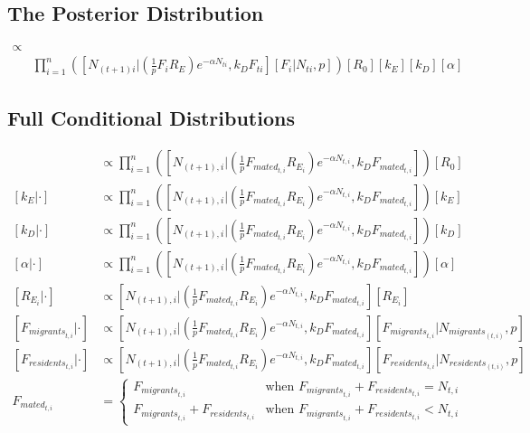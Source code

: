 \documentclass{article}[12pt]
\begin{document}
\subsection*{The Posterior Distribution}
\begin{align*}
[R_0, k_E, k_D, \alpha , \boldsymbol{R_E}, \boldsymbol{F} | \boldsymbol{N_t}, \boldsymbol{N_{t+1}}] \propto & \\ 
& \prod_{i=1}^{n}\left([N_{(t+1)i}|\left(\frac{1}{p}F_iR_E\right)e^{-\alpha N_{ti}}, k_DF_{ti}][F_i|N_{ti},p]\right)[R_0][k_E][k_D][\alpha]
\end{align*}

\subsection*{Full Conditional Distributions}
\begin{align*}
	[R_0 | \cdot] & \propto \prod_{i=1}^{n} \left( \left[ N_{(t+1), i} | \left(\frac{1}{p}F_{{mated}_{t,i}}R_{E_i} \right) e^{-\alpha N_{t, i}}, k_D F_{{mated}_{t,i}}\right] \right)[R_0] \\
	[k_E | \cdot] & \propto \prod_{i=1}^{n}\left( \left[N_{(t+1), i} | \left(\frac{1}{p}F_{{mated}_{t,i}}R_{E_i} \right)e^{-\alpha N_{t, i}}, k_DF_{{mated}_{t,i}} \right] \right) \left[k_E \right] \\
	[k_D | \cdot] & \propto \prod_{i=1}^{n}\left( \left[N_{(t+1), i} | \left(\frac{1}{p}F_{{mated}_{t,i}}R_{E_i} \right)e^{-\alpha N_{t, i}}, k_DF_{{mated}_{t,i}} \right] \right) \left[k_D \right] \\
	[\alpha | \cdot] & \propto \prod_{i=1}^{n}\left( \left[N_{(t+1), i} | \left(\frac{1}{p}F_{{mated}_{t,i}}R_{E_i} \right)e^{-\alpha N_{t, i}}, k_DF_{{mated}_{t,i}} \right] \right) \left [\alpha \right] \\
	[R_{E_i} | \cdot] & \propto \left[ N_{(t+1), i} | \left(\frac{1}{p}F_{{mated}_{t,i}}R_{E_i}\right)e^{-\alpha N_{t, i}}, k_DF_{{mated}_{t,i}}\right] \left[R_{E_i}\right] \\
	[F_{{migrants}_{t,i}} | \cdot] & \propto \left[N_{(t+1), i}|\left(\frac{1}{p}F_{{mated}_{t,i}}R_{E_i} \right)e^{-\alpha N_{t, i}}, k_DF_{{mated}_{t,i}} \right] \left[F_{{migrants}_{t,i}} | N_{{migrants}_{(t, i)}},p \right] \\
	[F_{{residents}_{t,i}} | \cdot] & \propto \left[N_{(t+1), i}|\left(\frac{1}{p}F_{{mated}_{t,i}}R_{E_i} \right)e^{-\alpha N_{t, i}}, k_DF_{{mated}_{t,i}} \right] \left[F_{{residents}_{t,i}} | N_{{residents}_{(t, i)}},p \right] \\
F_{{mated}_{t,i}} & = \begin{cases}
	F_{{migrants}_{t, i}} & \text{when } F_{{migrants}_{t, i}} + F_{{residents}_{t,i}} = N_{t, i}  \\
	F_{{migrants}_{t, i}} + F_{{residents}_{t,i}} & \text{when } F_{{migrants}_{t, i}} + F_{{residents}_{t,i}} < N_{t, i}
	\end{cases}
\end{align*}


\end{document}
